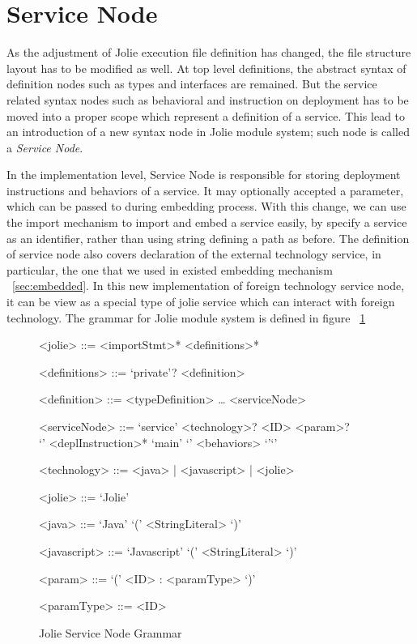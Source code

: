 \section{Service Node}

As the adjustment of Jolie execution file definition has changed, the file structure layout has to be modified as well.  At top level definitions, the abstract syntax of definition nodes such as types and interfaces are remained. But the service related syntax nodes such as behavioral and instruction on deployment has to be moved into a proper scope which represent a definition of a service. This lead to an introduction of a new syntax node in Jolie module system; such node is called a \textit{Service Node}.

In the implementation level, Service Node is responsible for storing deployment instructions and behaviors of a service. It may optionally accepted a parameter, which can be passed to during embedding process.
With this change, we can use the import mechanism to import and embed a service easily, by specify a service as an identifier, rather than using string defining a path as before.
The definition of service node also covers declaration of the external technology service, in particular, the one that we used in existed embedding mechanism ~\ref{sec:embedded}.
In this new implementation of foreign technology service node, it can be view as a special type of jolie service which can interact with foreign technology.
The grammar for Jolie module system is defined in figure ~\ref{fig:jolie-servicenode-grammar}

\begin{figure}[h]
    \begin{framed}
        \begin{grammar}
            <jolie> ::= <importStmt>* <definitions>*

            <definitions> ::= `private'? <definition>

            <definition> ::=  <typeDefinition>
            \dots
            \alt <serviceNode>

            <serviceNode> ::= `service' <technology>? <ID> <param>? \\ `{' <deplInstruction>* `main' `{' <behaviors> `}'`}'

            <technology> ::= <java> | <javascript> | <jolie>

            <jolie> ::= `Jolie'

            <java> ::= `Java' `(' <StringLiteral> `)'

            <javascript> ::= `Javascript' `(' <StringLiteral> `)'

            <param> ::= `(' <ID> : <paramType> `)'

            <paramType> ::= <ID>
        \end{grammar}
    \end{framed}
    \caption{Jolie Service Node Grammar}
    \label{fig:jolie-servicenode-grammar}
\end{figure}

